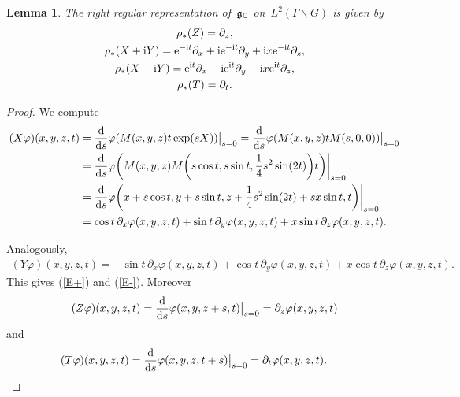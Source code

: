 \documentclass[10pt,a4paper]{amsart}
\newcommand\fg{{\frak{g}}}
\numberwithin{equation}{section}
\newtheorem{Lemma}[Theorem]{Lemma}
\begin{document}
\begin{Lemma}\label{Lrep}
The right regular representation of~$\fg_{\mathbb C}$ on~$L^2(\Gamma\backslash G)$ is given by
\begin{gather}
\rho_*(Z)=\partial_z \label{EZ},
\\
\rho_*(X+{\rm i}Y)={\rm e}^{-{\rm i}t}\partial_x +{\rm i}{\rm e}^{-{\rm i}t} \partial_y +{\rm i}x {\rm e}^{-{\rm i}t} \partial_z \label{E+},
\\
\rho_*(X-{\rm i}Y)={\rm e}^{{\rm i}t}\partial_x -{\rm i}{\rm e}^{{\rm i}t} \partial_y -{\rm i}x {\rm e}^{{\rm i}t} \partial_z \label{E-},
\\
\rho_*(T)=\partial_t. \label{ET}
\end{gather}
\end{Lemma}
\begin{proof}
We compute
\begin{align*}
(X\varphi)(x,y,z,t)&=\frac{\rm d}{{\rm d} s}\varphi(M(x,y,z)t\exp(sX))\big|_{s=0}
=\frac{\rm d}{{\rm d} s}\varphi(M(x,y,z)t M(s,0,0))\big|_{s=0}
\\
&=\frac{\rm d}{{\rm d} s}\varphi\bigg(M(x,y,z)M\bigg(s\cos t,s\sin t, \frac{1}{4}s^2\sin(2t)\bigg)t\bigg)\bigg|_{s=0}
\\
&=\frac{\rm d}{{\rm d} s}\varphi\bigg(x+s\cos t,y+s\sin t,z+ \frac{1}{4}s^2\sin(2t)+sx\sin t,t\bigg)\bigg|_{s=0}
\\
&=\cos t\,\partial_x \varphi(x,y,z,t) +\sin t\,\partial_y\varphi(x,y,z,t) +x\sin t\, \partial_z \varphi(x,y,z,t).
\end{align*}

Analogously,
\begin{gather*}
(Y\varphi)(x,y,z,t)
=-\sin t\,\partial_x\varphi(x,y,z,t) +\cos t\,\partial_y\varphi(x,y,z,t) +x\cos t\,\partial_z\varphi(x,y,z,t).
\end{gather*}
This gives (\ref{E+}) and (\ref{E-}).
Moreover
\begin{gather*}
(Z\varphi)(x,y,z,t)
=\frac{\rm d}{{\rm d} s}\varphi(x,y,z+s,t)\big|_{s=0}=\partial_z\varphi(x,y,z,t)
\end{gather*}
and
\begin{gather*}
(T\varphi)(x,y,z,t)
=\frac{\rm d}{{\rm d} s}\varphi(x,y,z,t+s)\big|_{s=0}=\partial_t\varphi(x,y,z,t).
\tag*{\qed}
\end{gather*}
\renewcommand{\qed}{}
\end{proof}
\end{document}

